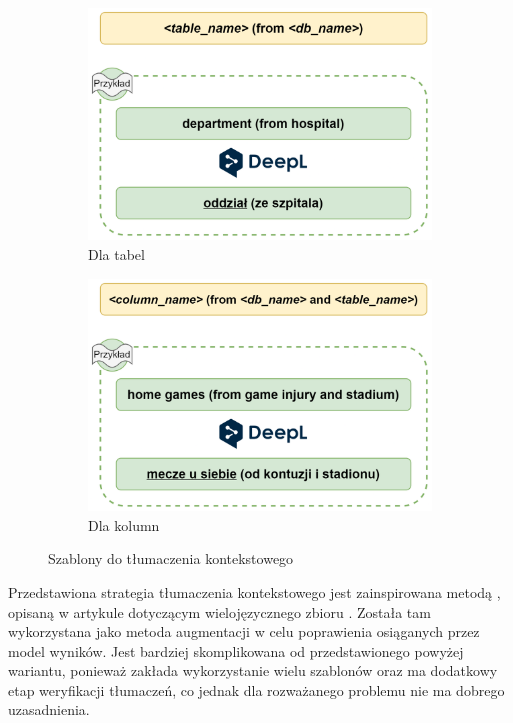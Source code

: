 \begin{figure}[ht!]
\centering
\begin{subfigure}{0.49\textwidth}
    \includegraphics[width=\textwidth]{images/translation_in_context_table.png}
    \caption{Dla tabel}
    \label{fig:first}
\end{subfigure}
\hfill
\begin{subfigure}{0.49\textwidth}
    \includegraphics[width=\textwidth]{images/translation_in_context_column.png}
    \caption{Dla kolumn}
    \label{fig:second}
\end{subfigure}
\caption{Szablony do tłumaczenia kontekstowego}
\label{fig:translation-in-context}
\end{figure}

Przedstawiona strategia tłumaczenia kontekstowego jest zainspirowana metodą , opisaną w artykule dotyczącym wielojęzycznego zbioru  \cite{Dou2022}. Została tam wykorzystana jako metoda augmentacji w celu poprawienia osiąganych przez model wyników. Jest bardziej skomplikowana od przedstawionego powyżej wariantu, ponieważ zakłada wykorzystanie wielu szablonów oraz ma dodatkowy etap weryfikacji tłumaczeń, co jednak dla rozważanego problemu nie ma dobrego uzasadnienia.

